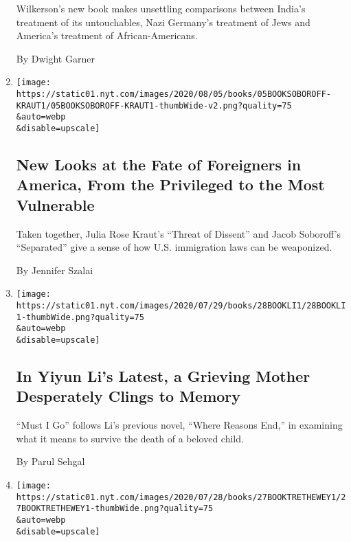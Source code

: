 \begin{enumerate}
  Wilkerson's new book makes unsettling comparisons between India's
  treatment of its untouchables, Nazi Germany's treatment of Jews and
  America's treatment of African-Americans.

  By Dwight Garner
\item
  \href{/2020/07/30/books/review-threat-dissent-julia-rose-kraut-separated-jacob-soboroff.html}{}

  \texttt{[image: https://static01.nyt.com/images/2020/08/05/books/05BOOKSOBOROFF-KRAUT1/05BOOKSOBOROFF-KRAUT1-thumbWide-v2.png?quality=75\\\&auto=webp\\\&disable=upscale]}

  \hypertarget{new-looks-at-the-fate-of-foreigners-in-america-from-the-privileged-to-the-most-vulnerable}{%
  \subsection{New Looks at the Fate of Foreigners in America, From the
  Privileged to the Most
  Vulnerable}\label{new-looks-at-the-fate-of-foreigners-in-america-from-the-privileged-to-the-most-vulnerable}}

  Taken together, Julia Rose Kraut's ``Threat of Dissent'' and Jacob
  Soboroff's ``Separated'' give a sense of how U.S. immigration laws can
  be weaponized.

  By Jennifer Szalai
\item
  \href{/2020/07/28/books/review-must-i-go-yiyun-li.html}{}

  \texttt{[image: https://static01.nyt.com/images/2020/07/29/books/28BOOKLI1/28BOOKLI1-thumbWide.png?quality=75\\\&auto=webp\\\&disable=upscale]}

  \hypertarget{in-yiyun-lis-latest-a-grieving-mother-desperately-clings-to-memory}{%
  \subsection{In Yiyun Li's Latest, a Grieving Mother Desperately Clings
  to
  Memory}\label{in-yiyun-lis-latest-a-grieving-mother-desperately-clings-to-memory}}

  ``Must I Go'' follows Li's previous novel, ``Where Reasons End,'' in
  examining what it means to survive the death of a beloved child.

  By Parul Sehgal
\item
  \href{/2020/07/27/books/review-memorial-drive-memoir-natasha-trethewey.html}{}

  \texttt{[image: https://static01.nyt.com/images/2020/07/28/books/27BOOKTRETHEWEY1/27BOOKTRETHEWEY1-thumbWide.png?quality=75\\\&auto=webp\\\&disable=upscale]}


\end{enumerate}
